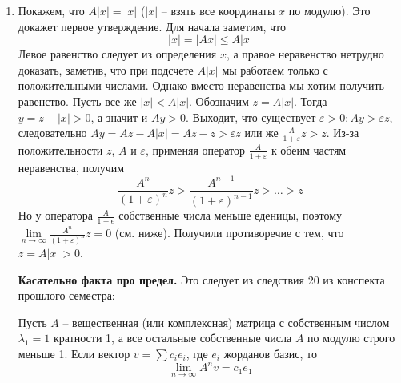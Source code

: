   \begin{enumerate}
  	\item Покажем, что $ A|x| = |x| $ ($ |x| $ -- взять все координаты $ x $ по модулю). Это докажет первое утверждение. Для начала заметим, что 
  	$$ |x| = |Ax| \le A|x| $$ 
  	Левое равенство следует из определения $ x $, а правое неравенство нетрудно доказать, заметив, что при подсчете $ A|x| $ мы работаем только с положительными числами. Однако вместо неравенства мы хотим получить равенство. Пусть все же $ |x| < A|x| $. Обозначим $ z = A|x| $. Тогда $ y = z - |x| > 0 $, а значит и $ Ay > 0 $. Выходит, что существует $ \varepsilon > 0: Ay > \varepsilon z $, следовательно $ Ay = Az - A|x| = Az - z > \varepsilon z $ или же $ \frac{A}{1+\varepsilon} z > z $. Из-за положительности $ z $, $ A $ и $ \varepsilon $, применяя оператор $ \frac{A}{1+\varepsilon} $ к обеим частям неравенства, получим
  	$$ \frac{A^n}{(1+\varepsilon)^n}z > \frac{A^{n-1}}{(1+\varepsilon)^{n-1}}z > \ldots > z $$
  	Но у оператора $ \frac{A}{1+\epsilon} $ собственные числа меньше еденицы, поэтому $ \lim\limits_{n\to\infty} \frac{A^n}{(1+\varepsilon)^n}z = 0 $ (см. ниже). Получили противоречие с тем, что $ z = A|x| > 0 $.

  	\textbf{Касательно факта про предел.} Это следует из следствия 20 из конспекта прошлого семестра:

  	Пусть $ A $ -- вещественная (или комплексная) матрица с собственным числом $\lambda_1=1$ кратности 1, а все остальные собственные числа $A$ по модулю строго меньше 1. Если вектор $v= \sum c_i e_i$, где $e_i$ жорданов базис, то $$ \lim_{n \to \infty}A^nv = c_1 e_1 $$


\end{enumerate}
